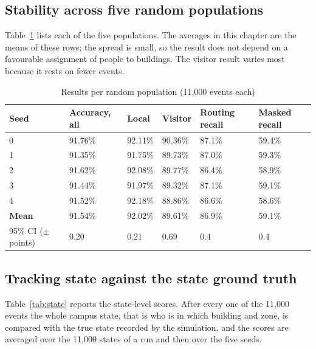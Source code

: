 \documentclass[12pt,a4paper,oneside]{report}
\begin{document}
\subsection{Stability across five random populations}\label{sec:res-seeds}
Table~\ref{tab:seeds} lists each of the five populations. The averages in this chapter are the means of these rows; the spread is small, so the result does not depend on a favourable assignment of people to buildings. The visitor result varies most because it rests on fewer events.

\begin{table}[htbp]
\centering
\caption{Results per random population (11,000 events each)}\label{tab:seeds}
{\small\setlength{\tabcolsep}{4pt}\renewcommand{\arraystretch}{1.2}
\begin{tabular}{|p{1.6cm}|p{2.2cm}|p{2.2cm}|p{2.2cm}|p{2.4cm}|p{2.2cm}|}\hline
\textbf{Seed} & \textbf{Accuracy, all} & \textbf{Local} & \textbf{Visitor} & \textbf{Routing recall} & \textbf{Masked recall}\\\hline
0 & 91.76\% & 92.11\% & 90.36\% & 87.1\% & 59.4\%\\\hline
1 & 91.35\% & 91.75\% & 89.73\% & 87.0\% & 59.3\%\\\hline
2 & 91.62\% & 92.08\% & 89.77\% & 86.4\% & 58.9\%\\\hline
3 & 91.44\% & 91.97\% & 89.32\% & 87.1\% & 59.1\%\\\hline
4 & 91.52\% & 92.18\% & 88.86\% & 86.6\% & 58.6\%\\\hline
\textbf{Mean} & 91.54\% & 92.02\% & 89.61\% & 86.9\% & 59.1\%\\\hline
95\% CI ($\pm$ points) & 0.20 & 0.21 & 0.69 & 0.4 & 0.4\\\hline
\end{tabular}}
\end{table}

\subsection{Tracking state against the state ground truth}\label{sec:res-state}
Table~\ref{tab:state} reports the state-level scores. After every one of the 11,000 events the whole campus state, that is who is in which building and zone, is compared with the true state recorded by the simulation, and the scores are averaged over the 11,000 states of a run and then over the five seeds.
\end{document}
